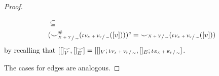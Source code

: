 \begin{proof}
\begin{enumerate}
\begin{align*}
                &\subseteq\\
                &({\smile}_{\sfrac{X+Y}{\sim}}^{{\#}}(\iota_{\sfrac{V_{X} + V_{Y}}{\sim}}([v])))^{c} = {\smile}_{\sfrac{X+Y}{\sim}}(\iota_{\sfrac{V_{X} + V_{Y}}{\sim}}([v]))\\
              \end{align*}
              \fi
              by recalling that $[[]_{V}^{{\smile}}, []_{E}^{{\smile}}] = [[]_{V};\iota_{\sfrac{V_{X} + V_{Y}}{\sim}}, []_{E};\iota_{\sfrac{E_{X} + E_{Y}}{\sim}}]$.
    \end{enumerate}

    The cases for edges are analogous.






\end{proof}
